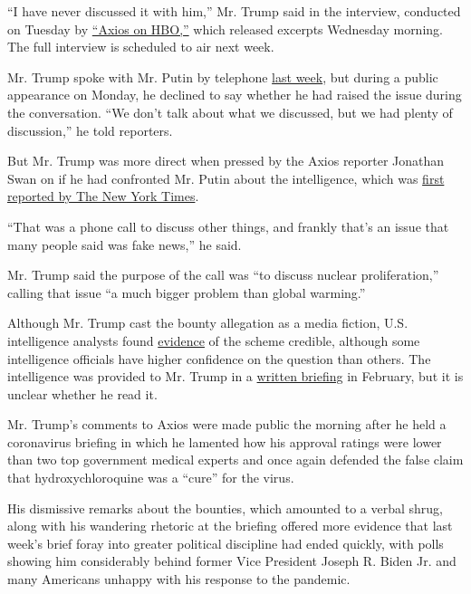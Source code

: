 ``I have never discussed it with him,'' Mr. Trump said in the interview,
conducted on Tuesday by
\href{https://www.axios.com/trump-russia-bounties-taliban-putin-call-4a0f6110-ab58-41c0-96fc-57b507462af1.html?utm_source=newsletter\&utm_medium=email\&utm_campaign=newsletter_axiosam\&stream=top}{``Axios
on HBO,''} which released excerpts Wednesday morning. The full interview
is scheduled to air next week.

Mr. Trump spoke with Mr. Putin by telephone
\href{https://www.nytimes.com/reuters/2020/07/23/world/europe/23reuters-russia-usa-putin-trump.html}{last
week}, but during a public appearance on Monday, he declined to say
whether he had raised the issue during the conversation. ``We don't talk
about what we discussed, but we had plenty of discussion,'' he told
reporters.

But Mr. Trump was more direct when pressed by the Axios reporter
Jonathan Swan on if he had confronted Mr. Putin about the intelligence,
which was
\href{https://www.nytimes.com/2020/06/29/us/politics/russian-bounty-trump.html}{first
reported by The New York Times}.

``That was a phone call to discuss other things, and frankly that's an
issue that many people said was fake news,'' he said.

Mr. Trump said the purpose of the call was ``to discuss nuclear
proliferation,'' calling that issue ``a much bigger problem than global
warming.''

Although Mr. Trump cast the bounty allegation as a media fiction, U.S.
intelligence analysts found
\href{https://slack-redir.net/link?url=https\%3A\%2F\%2Fwww.nytimes.com\%2F2020\%2F06\%2F30\%2Fus\%2Fpolitics\%2Frussian-bounties-afghanistan-intelligence.html}{evidence}
of the scheme credible, although some intelligence officials have higher
confidence on the question than others. The intelligence was provided to
Mr. Trump in a
\href{https://slack-redir.net/link?url=https\%3A\%2F\%2Fwww.nytimes.com\%2F2020\%2F06\%2F29\%2Fus\%2Fpolitics\%2Frussian-bounty-trump.html}{written
briefing} in February, but it is unclear whether he read it.

Mr. Trump's comments to Axios were made public the morning after he held
a coronavirus briefing in which he lamented how his approval ratings
were lower than two top government medical experts and once again
defended the false claim that hydroxychloroquine was a ``cure'' for the
virus.

His dismissive remarks about the bounties, which amounted to a verbal
shrug, along with his wandering rhetoric at the briefing offered more
evidence that last week's brief foray into greater political discipline
had ended quickly, with polls showing him considerably behind former
Vice President Joseph R. Biden Jr. and many Americans unhappy with his
response to the pandemic.

